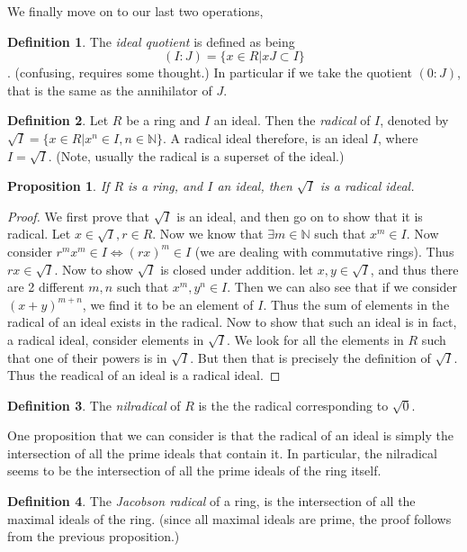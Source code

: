 \documentclass[12pt]{book}
\newtheorem{proposition}{Proposition}[section]
\theoremstyle{definition}
\newtheorem*{definition}{Definition}
\begin{document}
We finally move on to our last two operations, 
\begin{definition}
    The \textit{ideal quotient} is defined as being $$(I : J) = \{x \in R| xJ \subset I\}$$. (confusing, requires some thought.)
    In particular if we take the quotient $(0: J)$, that is the same as the annihilator of $J$.
\end{definition}
\begin{definition}
    Let $R$ be a ring and $I$ an ideal. Then the \textit{radical} of $I$, denoted by $\sqrt{I} = \{x \in R| x^n \in I, n \in \mathbb{N}\}$. A radical ideal therefore, is an ideal $I$, where $I = \sqrt{I}$. (Note, usually the radical is a superset of the ideal.)
\end{definition}
\begin{proposition}
    If $R$ is a ring, and $I$ an ideal, then $\sqrt{I}$ is a radical ideal.
\end{proposition}
\begin{proof}
    We first prove that $\sqrt{I}$ is an ideal, and then go on to show that it is radical. Let $x \in \sqrt{I}, r \in R$. Now we know that $\exists m \in \mathbb{N}$ such that $x^m \in I$. Now consider $r^mx^m \in I \iff (rx)^m \in I$ (we are dealing with commutative rings). Thus $rx \in \sqrt{I}$. Now to show $\sqrt{I}$ is closed under addition. let $x, y \in \sqrt I$, and thus there are 2 different $m, n$ such that $x^m, y^n \in I$. Then we can also see that if we consider $(x + y)^{m+n}$, we find it to be an element of $I$. Thus the sum of elements in the radical of an ideal exists in the radical. Now to show that such an ideal is in fact, a radical ideal, consider elements in $\sqrt{I}$. We look for all the elements in $R$ such that one of their powers is in $\sqrt{I}$. But then that is precisely the definition of $\sqrt{I}$. Thus the readical of an ideal is a radical ideal.
\end{proof}
\begin{definition}
    The \textit{nilradical} of $R$ is the the radical corresponding to $\sqrt{0}$.
\end{definition}
One proposition that we can consider is that the radical of an ideal is simply the intersection of all the prime ideals that contain it. In particular, the nilradical seems to be the intersection of all the prime ideals of the ring itself.
\begin{definition}
    The \textit{Jacobson radical} of a ring, is the intersection of all the maximal ideals of the ring. (since all maximal ideals are prime, the proof follows from the previous proposition.)
\end{definition}
\end{document}
